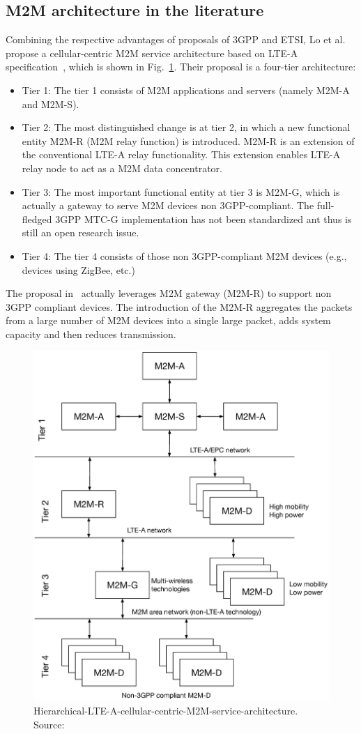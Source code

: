 \subsection{M2M architecture in the literature}
Combining the respective advantages of proposals of 3GPP and ETSI, Lo et al. propose a cellular-centric M2M service architecture based on LTE-A specification~\cite{Loa2013}, which is shown in Fig.~\ref{fig:hybrid-ref-arch}. Their proposal is a four-tier architecture:
\begin{itemize}[leftmargin=*, noitemsep]
	\item Tier 1: The tier 1 consists of M2M applications and servers (namely M2M-A and M2M-S).
	\item Tier 2: The most distinguished change is at tier 2, in which a new functional entity M2M-R (M2M relay function) is introduced.  M2M-R is an extension of the conventional LTE-A relay functionality. This extension enables LTE-A relay node to act as a M2M data concentrator.
	\item Tier 3: The most important functional entity at tier 3 is M2M-G, which is actually a gateway to serve M2M devices non 3GPP-compliant. The full-fledged 3GPP MTC-G implementation has not been standardized ant thus is still an open research issue.
	\item Tier 4: The tier 4 consists of those non 3GPP-compliant M2M devices (e.g., devices using ZigBee, etc.)
\end{itemize}
The proposal in~\cite{Loa2013} actually leverages M2M gateway (M2M-R) to support non 3GPP compliant devices. The introduction of the M2M-R aggregates the packets from a large number of M2M devices into a single large packet, adds system capacity and then reduces transmission.
\begin{figure}[!t]
	\centering
	\includegraphics[width=0.95\linewidth]{Chapter2/Figures/Hierarchical-LTE-A-cellular-centric-M2M-service-architecture}
	\caption{Hierarchical-LTE-A-cellular-centric-M2M-service-architecture. Source: \cite{Loa2013}}
	\label{fig:hybrid-ref-arch}
\end{figure}